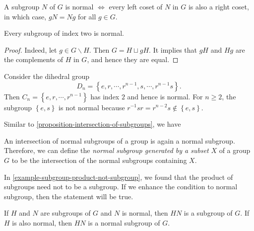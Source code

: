 \begin{proposition}
  \label{proposition-left-right-coset-of-normal-subgroup}
  A subgroup \( N \) of \( G \) is normal \( \iff \) every left coset of \( N \) in \( G \) is also a right coset, in which case, \( gN = N g \) for all \( g \in G \).
\end{proposition}

\begin{proposition}
  \label{proposition-index-2-subgroup-is-normal}
  Every subgroup of index two is normal.
\end{proposition}
\begin{proof}
  Indeed, let \( g \in G \backslash H \).
  Then \( G = H \sqcup gH \).
  It implies that \( gH \) and \( Hg \) are the complements of \( H \) in \( G \), and hence they are equal.
\end{proof}

\begin{example}
  \label{example-normal-subgroup-in-dihedral-group}
  Consider the dihedral group
  \[
    D_n = \left\lbrace e, r, \cdots, r^{n - 1}, s, \cdots,r^{n - 1}s \right\rbrace.
  \]
  Then \( C_n = \left\lbrace e, r, \cdots, r^{n - 1} \right\rbrace \) has index \( 2 \) and hence is normal.
  For \( n \geq 2 \), the subgroup \( \left\lbrace e, s \right\rbrace \) is not normal because \( r^{-1}sr = r^{n - 2}s \notin \left\lbrace e, s \right\rbrace \).
\end{example}

Similar to \ref{proposition-intersection-of-subgroups}, we have
\begin{proposition}
  \label{proposition-intersection-of-normal-subgroups}
  An intersection of normal subgroups of a group is again a normal subgroup.
  Therefore, we can define the \emph{normal subgroup generated by a subset} \( X \) of a group \( G \) to be the intersection of the normal subgroups containing \( X \).
\end{proposition}

In \ref{example-subgroup-product-not-subgroup}, we found that the product of subgroups need not to be a subgroup.
If we enhance the condition to normal subgroup, then the statement will be true.

\begin{theorem}
  \label{theorem-normal-and-subgroups}
  If \( H \) and \( N \) are subgroups of \( G \) and \( N \) is normal, then \( HN \) is a subgroup of \( G \).
  If \( H \) is also normal, then \( HN \) is a normal subgroup of \( G \).
\end{theorem}

